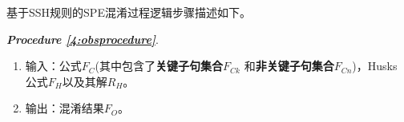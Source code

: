 %
%
%
%
%

基于SSH规则的SPE混淆过程逻辑步骤描述如下。

\textit{\textbf{Procedure \ref{4:obsprocedure}}}.
\begin{enumerate}
\item[]\label{4:obsprocedure} 输入：公式$F_C$(其中包含了\textbf{关键子句集合$F_{Ck}$}
和\textbf{非关键子句集合$F_{Cn}$})，Husks 公式$F_H$以及其解$R_H$。
\item[] 输出：混淆结果$F_O$。
\end{enumerate}

